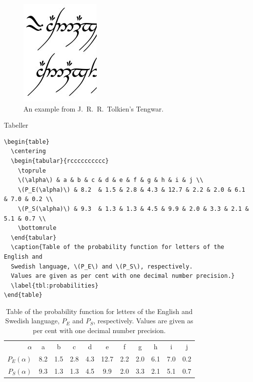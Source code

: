 \begin{frame}
	\begin{figure}
		\centering
		\includegraphics[width=0.2\linewidth]{tengwar.jpg}
    \caption{An example from J.~R.~R.~Tolkien's Tengwar.}
    \label{fig:bild}
	\end{figure}
\end{frame}

\begin{frame}{Tabeller}
	\begin{lstlisting}
\begin{table}
  \centering
  \begin{tabular}{rcccccccccc}
    \toprule
    \(\alpha\) & a & b & c & d & e & f & g & h & i & j \\
    \(P_E(\alpha)\) & 8.2  & 1.5 & 2.8 & 4.3 & 12.7 & 2.2 & 2.0 & 6.1 & 7.0 & 0.2 \\
    \(P_S(\alpha)\) & 9.3  & 1.3 & 1.3 & 4.5 & 9.9 & 2.0 & 3.3 & 2.1 & 5.1 & 0.7 \\
    \bottomrule
  \end{tabular}
  \caption{Table of the probability function for letters of the English and 
  Swedish language, \(P_E\) and \(P_S\), respectively.
  Values are given as per cent with one decimal number precision.}
  \label{tbl:probabilities}
\end{table}
	\end{lstlisting}
\end{frame}

\begin{frame}
\begin{table}
  \centering
  \begin{tabular}{rcccccccccc}
    \toprule
    \(\alpha\) & a & b & c & d & e & f & g & h & i & j \\
    \(P_E(\alpha)\) & 8.2  & 1.5 & 2.8 & 4.3 & 12.7 & 2.2 & 2.0 & 6.1 & 7.0 & 0.2 \\
    \(P_S(\alpha)\) & 9.3  & 1.3 & 1.3 & 4.5 & 9.9 & 2.0 & 3.3 & 2.1 & 5.1 & 0.7 \\
    \bottomrule
  \end{tabular}
  \caption{Table of the probability function for letters of the English and 
  Swedish language, \(P_E\) and \(P_S\), respectively.
  Values are given as per cent with one decimal number precision.}
  \label{tbl:probabilities}
\end{table}
\end{frame}


